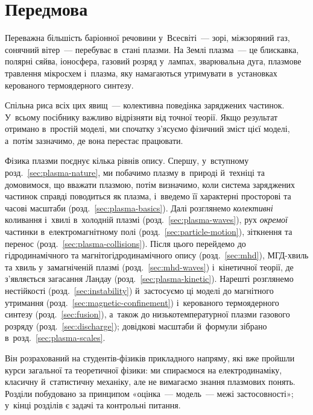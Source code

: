 
\chapter*{Передмова}\label{\currfilebase}\hypertarget{\currfilebase}{}


Переважна більшість баріонної речовини у~Всесвіті~--- зорі, міжзоряний газ, сонячний
вітер~--- перебуває в~стані плазми. На Землі плазма~--- це блискавка, полярні сяйва,
іоносфера, газовий розряд у~лампах, зварювальна дуга, плазмове травлення мікросхем
і~плазма, яку намагаються утримувати в~установках керованого термоядерного синтезу.

Спільна риса всіх цих явищ~--- колективна поведінка заряджених частинок. У~всьому посібнику
важливо відрізняти  від точної теорії. Якщо результат отримано
в~простій моделі, ми спочатку з'ясуємо фізичний зміст цієї моделі, а~потім зазначимо, де
вона перестає працювати.




Фізика плазми поєднує кілька рівнів опису. Спершу, у~вступному розд.~\ref{sec:plasma-nature}, ми побачимо плазму в~природі й~техніці та домовимося, що вважати плазмою,
потім визначимо, коли система заряджених частинок справді поводиться як плазма, і~введемо її
характерні просторові та часові масштаби (розд.~\ref{sec:plasma-basics}). Далі розглянемо \emph{колективні}
коливання і~хвилі в~холодній плазмі (розд.~\ref{sec:plasma-waves}), рух \emph{окремої} частинки
в~електромагнітному полі (розд.~\ref{sec:particle-motion}), зіткнення та перенос (розд.~\ref{sec:plasma-collisions}).
Після цього перейдемо до гідродинамічного та магнітогідродинамічного опису (розд.~\ref{sec:mhd}),
МГД-хвиль та хвиль у~замагніченій плазмі (розд.~\ref{sec:mhd-waves}) і~кінетичної
теорії, де з'являється загасання Ландау (розд.~\ref{sec:plasma-kinetic}). Нарешті розглянемо нестійкості
(розд.~\ref{sec:instability}) й~застосуємо ці
моделі до магнітного утримання (розд.~\ref{sec:magnetic-confinement}) і~керованого термоядерного синтезу
(розд.~\ref{sec:fusion}), а~також до низькотемпературної плазми газового
розряду (розд.~\ref{sec:discharge}); довідкові
масштаби й~формули зібрано в~розд.~\ref{sec:plasma-scales}.

 Він розрахований на студентів-фізиків прикладного напряму, які вже
пройшли курси загальної та теоретичної фізики: ми спираємося на електродинаміку, класичну й~статистичну
механіку, але не вимагаємо знання плазмових понять. Розділи побудовано за принципом «оцінка~--- модель~--- межі
застосовності»; у~кінці розділів є задачі та контрольні питання.

